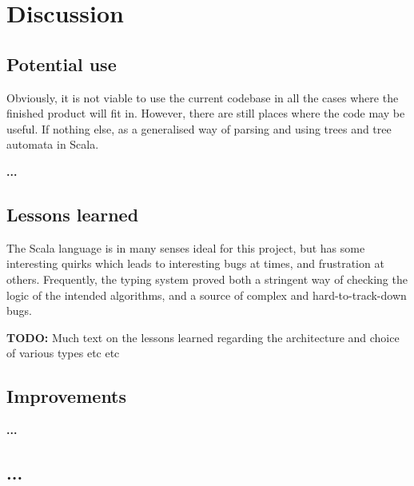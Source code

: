 \section{Discussion}

\subsection{Potential use}

Obviously, it is not viable to use the current codebase in all the cases
where the finished product will fit in. However, there are still places
where the code may be useful. If nothing else, as a generalised way of
parsing and using trees and tree automata in Scala. 


\textbf{...} %

\subsection{Lessons learned}

%
%
The Scala language is in many senses ideal for this project, but has some
interesting quirks which leads to interesting bugs at times, and
frustration at others. Frequently, the typing system proved both a
stringent way of checking the logic of the intended algorithms, and a
source of complex and hard-to-track-down bugs.

\textbf{TODO:} Much text on the lessons learned regarding the architecture
and choice of various types etc etc

\subsection{Improvements}

\textbf{...} %

\subsection{...}



